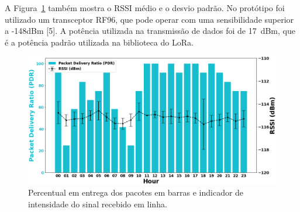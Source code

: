    A Figura~\ref{fig:pdrrssi} também mostra o RSSI médio e o desvio padrão. No protótipo foi utilizado um transceptor  RF96, que pode operar com uma sensibilidade superior a -148dBm [5]. A potência utilizada na transmissão de dados foi  de 17~dBm, que é a potência padrão utilizada na biblioteca do LoRa.%
   
   
   
   
   \begin{figure}[t!]
        \begin{center}
            \centering
            \setlength{\unitlength}{0.0105in}
            \includegraphics[width=.45\textwidth]{assets/pdr-rssi-5.png}
        \end{center}
        \caption{Percentual em entrega dos pacotes em barras e indicador de intensidade do sinal recebido em linha.}
        \label{fig:pdrrssi}
    \end{figure}